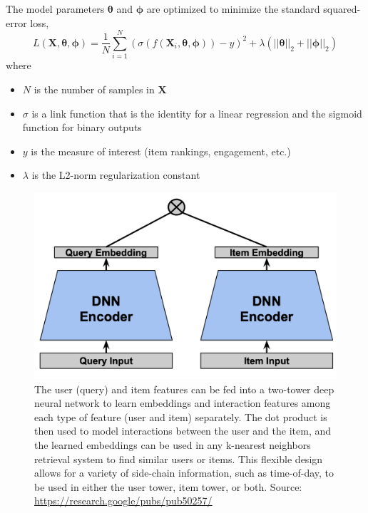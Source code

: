 \documentclass[manuscript, nonacm, screen=true]{acmart}
\begin{document}
The model parameters $\boldsymbol{\theta}$ and $\boldsymbol{\phi}$ are optimized to minimize the standard squared-error loss\cite{CF_neural, CF_neural2},
\begin{equation}
    L(\mathbf{X},\boldsymbol{\theta},\boldsymbol{\phi}) = \frac{1}{N}\sum_{i=1}^{N}(\sigma(f(\mathbf{X}_i,\boldsymbol{\theta},\boldsymbol{\phi})) - y)^2 + \lambda \left(||\boldsymbol{\theta}||_2 +  ||\boldsymbol{\phi}||_2\right)
\end{equation}where 
\begin{itemize}
\item $N$ is the number of samples in $\mathbf{X}$
\item $\sigma$ is a link function that is the identity for a linear regression and the sigmoid function for binary outputs
\item $y$ is the measure of interest (item rankings, engagement, etc.)
\item $\lambda$ is the L2-norm regularization constant
\end{itemize}

\begin{figure}[h]
  \includegraphics[width=0.75\linewidth]{two_tower.png}
  \caption{The user (query) and item features can be fed into a two-tower deep neural network to learn embeddings and interaction features among each type of feature (user and item) separately. The dot product is then used to model interactions between the user and the item, and the learned embeddings can be used in any k-nearest neighbors retrieval system to find similar users or items. This flexible design allows for a variety of side-chain information, such as time-of-day, to be used in either the user tower, item tower, or both. Source: \url{https://research.google/pubs/pub50257/}}
  \label{fig:two_tower}
\end{figure}
\end{document}
